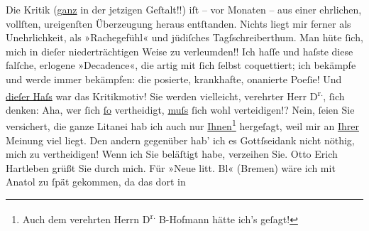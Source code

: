 \begin{ledgroupsized}[t]{13cm}
           \pstart
           Die Kritik (\uline{ganz} in der jetzigen Geſtalt!!) iſt – vor
                    Monaten – aus einer ehrlichen, vollſten, ureigenſten Überzeugung heraus
                    entſtanden. Nichts liegt mir ferner als Unehrlichkeit, als »Rachegefühl« und
                    jüdiſches Tagſschreiberthum. Man hüte ſich, mich in dieſer niederträchtigen
                    Weise zu verleumden!!\pend
           \pstart
           Ich haſſe und haſste diese falſche, erlogene »Decadence«, die artig mit ſich
                    ſelbst coquettiert; ich bekämpfe und werde immer bekämpfen: die posierte,
                    krankhafte, onanierte Poeſie! {\pb}Und
                        \uline{dieſer Haſs} war das Kritikmotiv!\pend
           \pstart
            Sie werden vielleicht, verehrter Herr
                        D\textsuperscript{r.}, ſich denken: Aha, wer ſich \uline{ſo} vertheidigt, \uline{muſs}{ }ſich wohl verteidigen!?  Nein, ſeien Sie versichert, die ganze Litanei
                    hab ich auch nur \uline{Ihnen}\footnote{\noindent{}Auch dem verehrten Herrn D\textsuperscript{r.}{ }B-Hofmann hätte ich’s geſagt!} hergeſagt, weil mir an \uline{Ihrer} Meinung
                         viel liegt. Den andern gegenüber hab’
                    ich es Gottſseidank nicht nöthig, mich zu vertheidigen!\pend
           \pstart
           Wenn ich Sie beläſtigt habe, verzeihen Sie.\pend
           \pstart
           Otto Erich Hartleben grüßt Sie durch
                    mich.\pend
           \pstart
           Für »Neue litt. Bl« \introOben{}(Bremen)\introOben{} wäre ich mit Anatol zu ſpät gekommen, da das dort in
                        \label{K_L00191_1v}
\end{ledgroupsized}
